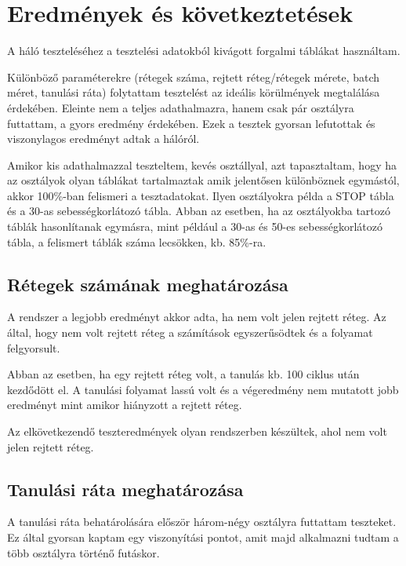 \chapter{Eredmények és következtetések}\label{ch:eredmenyek}

A háló teszteléséhez a tesztelési adatokból kivágott forgalmi táblákat használtam. 

Különböző paraméterekre (rétegek száma, rejtett réteg/rétegek mérete, batch méret, tanulási ráta) folytattam tesztelést az ideális körülmények megtalálása érdekében. Eleinte nem a teljes adathalmazra, hanem csak pár osztályra futtattam, a gyors eredmény érdekében. Ezek a tesztek gyorsan lefutottak és viszonylagos eredményt adtak a hálóról.

Amikor kis adathalmazzal teszteltem, kevés osztállyal, azt tapasztaltam, hogy ha az osztályok olyan táblákat tartalmaztak amik jelentősen különböznek egymástól, akkor 100\%-ban felismeri a tesztadatokat. Ilyen osztályokra példa a STOP tábla és a 30-as sebességkorlátozó tábla. Abban az esetben, ha az osztályokba tartozó táblák hasonlítanak egymásra, mint például a 30-as és 50-es sebességkorlátozó tábla, a felismert táblák száma lecsökken, kb. 85\%-ra.

\section{Rétegek számának meghatározása}

A rendszer a legjobb eredményt akkor adta, ha nem volt jelen rejtett réteg. Az által, hogy nem volt rejtett réteg a számítások egyszerűsödtek és a folyamat felgyorsult.

Abban az esetben, ha egy rejtett réteg volt, a tanulás kb. 100 ciklus után kezdődött el. A tanulási folyamat lassú volt és a végeredmény nem mutatott jobb eredményt mint amikor hiányzott a rejtett réteg.

Az elkövetkezendő teszteredmények olyan rendszerben készültek, ahol nem volt jelen rejtett réteg.

\section{Tanulási ráta meghatározása}

A tanulási ráta behatárolására először három-négy osztályra futtattam teszteket. Ez által gyorsan kaptam egy viszonyítási pontot, amit majd alkalmazni tudtam a több osztályra történő futáskor.

